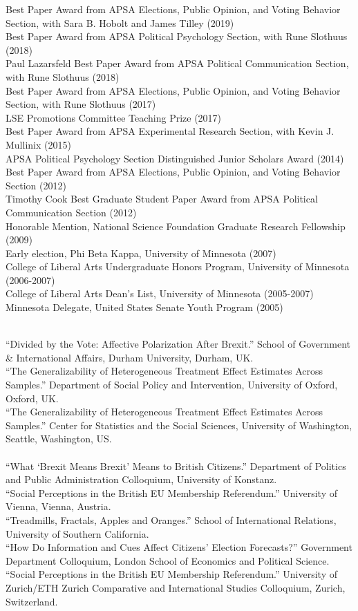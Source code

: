 \documentclass[12pt]{article}
\renewcommand{\section}[1]{\pagebreak[3]%
    \llap{\scshape\smash{\parbox[t]{\marginparwidth}{\raggedright {\color{lg}#1}}}}%
    \vspace{-\baselineskip}\par}
\newcommand{\topic}[1]{\pagebreak[3]\indent {\color{lg}{\footnotesize #1 }}\\}
\newcommand{\entry}[1]{\indent {\color{lg}\guillemotright}\hspace{2pt}#1\vspace{.25em}\\}
\begin{document}
\section{Honors \&\\Awards}
	\entry{Best Paper Award from APSA Elections, Public Opinion, and Voting Behavior Section, with Sara B. Hobolt and James Tilley (2019)}
    \entry{Best Paper Award from APSA Political Psychology Section, with Rune Slothuus (2018)}
    \entry{Paul Lazarsfeld Best Paper Award from APSA Political Communication Section, with Rune Slothuus (2018)}
    \entry{Best Paper Award from APSA Elections, Public Opinion, and Voting Behavior Section, with Rune Slothuus (2017)}
	\entry{LSE Promotions Committee Teaching Prize (2017)}
    \entry{Best Paper Award from APSA Experimental Research Section, with Kevin J. Mullinix (2015)}
	\entry{APSA Political Psychology Section Distinguished Junior Scholars Award (2014)}
	\entry{Best Paper Award from APSA Elections, Public Opinion, and Voting Behavior Section (2012)}
	\entry{Timothy Cook Best Graduate Student Paper Award from APSA Political Communication Section (2012)}
	\entry{Honorable Mention, National Science Foundation Graduate Research Fellowship (2009)}
	\entry{Early election, Phi Beta Kappa, University of Minnesota (2007)}
	\entry{College of Liberal Arts Undergraduate Honors Program, University of Minnesota (2006-2007)}
	\entry{College of Liberal Arts Dean's List, University of Minnesota (2005-2007)}
	\entry{Minnesota Delegate, United States Senate Youth Program (2005)}

\section{Invited\\Presentations\\\& Conference\\Papers}
	\topic{Invited Presentations (2018)}
    \entry{``Divided by the Vote: Affective Polarization After Brexit.'' School of Government \& International Affairs, Durham University, Durham, UK.}
    \entry{``The Generalizability of Heterogeneous Treatment Effect Estimates Across Samples.'' Department of Social Policy and Intervention, University of Oxford, Oxford, UK.}
    \entry{``The Generalizability of Heterogeneous Treatment Effect Estimates Across Samples.'' Center for Statistics and the Social Sciences, University of Washington, Seattle, Washington, US.}

    \topic{Invited Presentations (2017)}
    \entry{``What `Brexit Means Brexit' Means to British Citizens.'' Department of Politics and Public Administration Colloquium, University of Konstanz.}
    \entry{``Social Perceptions in the British EU Membership Referendum.'' University of Vienna, Vienna, Austria.}
    \entry{``Treadmills, Fractals, Apples and Oranges.'' School of International Relations, University of Southern California.}
    \entry{``How Do Information and Cues Affect Citizens' Election Forecasts?'' Government Department Colloquium, London School of Economics and Political Science.}
    \entry{``Social Perceptions in the British EU Membership Referendum.'' University of Zurich/ETH Zurich Comparative and International Studies Colloquium, Zurich, Switzerland.}
	
\end{document}
